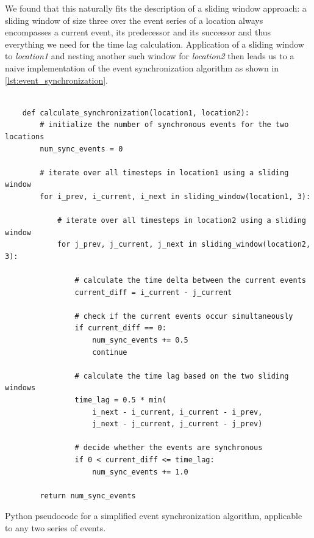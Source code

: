 We found that this naturally fits the description of a sliding window approach: a sliding window of size three over the event series of a location always encompasses a current event, its predecessor and its successor and thus everything we need for the time lag calculation. Application of a sliding window to \textit{location1} and nesting another such window for \textit{location2} then leads us to a naive implementation of the event synchronization algorithm as shown in \cref{lst:event_synchronization}.

\begin{listing}[H]
  \begin{verbatim}

    def calculate_synchronization(location1, location2):
        # initialize the number of synchronous events for the two locations
        num_sync_events = 0

        # iterate over all timesteps in location1 using a sliding window
        for i_prev, i_current, i_next in sliding_window(location1, 3):

            # iterate over all timesteps in location2 using a sliding window
            for j_prev, j_current, j_next in sliding_window(location2, 3):

                # calculate the time delta between the current events
                current_diff = i_current - j_current

                # check if the current events occur simultaneously
                if current_diff == 0:
                    num_sync_events += 0.5
                    continue

                # calculate the time lag based on the two sliding windows
                time_lag = 0.5 * min(
                    i_next - i_current, i_current - i_prev,
                    j_next - j_current, j_current - j_prev)

                # decide whether the events are synchronous
                if 0 < current_diff <= time_lag:
                    num_sync_events += 1.0

        return num_sync_events

  \end{verbatim}
  \caption{Python pseudocode for a simplified event synchronization algorithm, applicable to any two series of events.}
  \label{lst:event_synchronization}
\end{listing}


